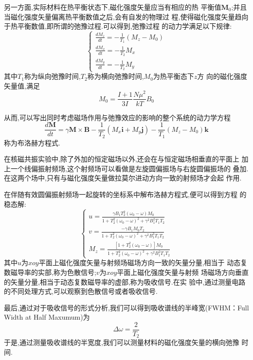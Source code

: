 \documentclass[aps,pre,12pt,preprint,onecolumn,showpacs,showkeys]{revtex4-1}
\begin{document}
另一方面,实际材料在热平衡状态下,磁化强度矢量应当有相应的热
平衡值$\bm{M}_0$;并且当磁化强度矢量偏离热平衡数值之后,会有自发的物理过
程,使得磁化强度矢量趋向于热平衡数值,即所谓的弛豫过程.可以得到,弛豫过程
的动力学满足以下规律:
\begin{equation}
\begin{cases}
\frac{dM_z}{dt} = - \frac{1}{T_1}(M_z - M_0) \\
\frac{dM_x}{dt} = - \frac{1}{T_2}M_x \\
\frac{dM_y}{dt} = - \frac{1}{T_2}M_y
\end{cases}
\end{equation}
其中$T_1$称为纵向弛豫时间,$T_2$称为横向弛豫时间,$M_0$为热平衡态下$z$方
向的磁化强度矢量值,满足
\begin{equation}
M_0 = \frac{I+1}{3I}\frac{N\mu^2}{kT}B_0
\end{equation}

从而,可以写出同时考虑磁场作用与弛豫效应的影响的整个系统的动力学方程
\begin{equation}
\frac{d\bm{M}}{dt} = \gamma\bm{M}\times\bm{B} -
\frac{1}{T_2}(M_x\bm{i} + M_y\bm{j}) - \frac{1}{T_1}(M_z -
M_0)\bm{k}
\end{equation}
称为布洛赫方程式.

在核磁共振实验中,除了外加的恒定磁场以外,还会在与恒定磁场相垂直的平面上
加上一个线偏振射频场,这个射频场可以看做是左旋圆偏振场与右旋圆偏振场的
叠加.在这两个场中,只有与磁化强度矢量做拉莫尔进动方向一致的射频场才会起
作用.

在伴随有效圆偏振射频场一起旋转的坐标系中解布洛赫方程式,便可以得到方程
的稳态解:
\begin{equation}
\begin{cases}
u = \frac{\gamma B_1 T^2_2(\omega_0 - \omega)M_0}{1 + T_2^2(\omega_0 -
  \omega)^2 + \gamma^2B_1^2T_1T_2}\\
v= \frac{-\gamma B_1 M_0T_2}{1 + T_2^2(\omega_0 -
  \omega)^2 + \gamma^2B_1^2T_1T_2} \\
M_z = \frac{\left[1 +T^2_2(\omega_0 - \omega) \right]M_0}{1 + T_2^2(\omega_0 -
  \omega)^2 + \gamma^2B_1^2T_1T_2}
\end{cases}
\end{equation}
其中$u$为$xoy$平面上磁化强度矢量与射频场磁场方向一致的矢量分量,相当于
动态复数磁导率的实部,称为色散信号;$v$为$xoy$平面上磁化强度矢量与射频
场磁场方向垂直的矢量分量,相当于动态复数磁导率的虚部,称为吸收信号.在实
验中,通过测量电路的不同处理方式,可以观察到色散信号或者吸收信号.

最后,通过对于吸收信号的形式分析,我们可以得到吸收谱线的半峰宽(FWHM：Full Width at Half Maxumum)为
\begin{equation}
\Delta \omega = \frac{2}{T_2}
\end{equation}
于是,通过测量吸收谱线的半宽度,我们可以测量材料的磁化强度矢量的横向弛豫
时间.
\end{document}
